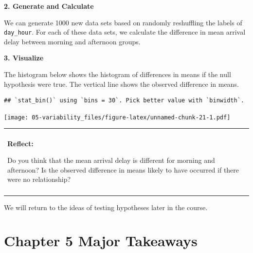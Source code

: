 \documentclass[
]{book}
\newenvironment{reflect}
{
    \begin{center}
    
    \begin{tabular}{|p{0.8\textwidth}|}
    \rowcolor{LightBlue}
    \hline\\
    \rowcolor{LightBlue}
    \textbf{Reflect:}
}
{
    \\\rowcolor{LightBlue}
    \\\hline
    \end{tabular} 
    \end{center}
}
\begin{document}
\textbf{2. Generate and Calculate}

We can generate 1000 new data sets based on randomly reshuffling the labels of \texttt{day\_hour}. For each of these data sets, we calculate the difference in mean arrival delay between morning and afternoon groups.

\textbf{3. Visualize}

The histogram below shows the histogram of differences in means if the null hypothesis were true. The vertical line shows the observed difference in means.

\begin{verbatim}
## `stat_bin()` using `bins = 30`. Pick better value with `binwidth`.
\end{verbatim}

\texttt{[image: 05-variability\_files/figure-latex/unnamed-chunk-21-1.pdf]}

\begin{reflect}
Do you think that the mean arrival delay is different for morning and
afternoon? Is the observed difference in means likely to have occurred
if there were no relationship?
\end{reflect}

We will return to the ideas of testing hypotheses later in the course.

\hypertarget{chapter-5-major-takeaways}{%
\section{Chapter 5 Major Takeaways}\label{chapter-5-major-takeaways}}
\end{document}
